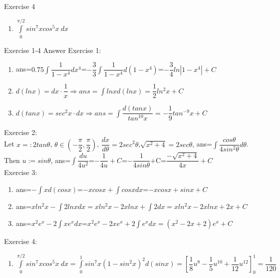 \documentclass{beamer}
\begin{document}
\begin{frame}{Exercise 4}
    \begin{enumerate}
        \item $\int\limits_0^{\pi/2} sin^7xcos^5x\ dx$
    \end{enumerate}
\end{frame}

\begin{frame}{Exercise 1-4 Answer}
\scriptsize
    Exercise 1:
    \begin{enumerate}
        \item ans=$0.75\int\dfrac{1}{1-x^4}dx^4$=$-\dfrac{3}{3}\int\dfrac{1}{1-x^4}d(1-x^4)$=$-\dfrac{3}{4}ln|1-x^4|+C$
        \item $d(ln x)=dx\cdot \dfrac{1}{x} \Rightarrow ans= \int lnx d(lnx)=\dfrac{1}{2}ln^2x+C$
        \item $d(tanx)=sec^2x\cdot dx\Rightarrow ans=\int \dfrac{d (tanx)}{tan^{10} x}=-\dfrac{1}{9}tan^{-9}x+C$
    \end{enumerate}
    Exercise 2:\\
    Let $x=:2tan\theta$, $\theta\in(-\dfrac{\pi}{2},\dfrac{\pi}{2})$, $\dfrac{dx}{d\theta}=2sec^2\theta$,$\sqrt{x^2+4}=2sec\theta$, ans=$\int \dfrac{cos\theta}{4sin^2\theta}d\theta$.\\
    Then $u:=sin\theta$, ans=$\int\dfrac{du}{4u^2}$=$-\dfrac{1}{4u}+C$=$-\dfrac{1}{4sin\theta}$+C=$\dfrac{-\sqrt{x^2+4}}{4x}+C$\\
    Exercise 3:
    \begin{enumerate}
        \item ans=$-\int xd(cosx)$=$-xcosx+\int cosx dx$=$-xcosx+sinx+C$
        \item ans=$xln^2x-\int 2lnxdx=xln^2x-2xlnx+\int 2dx=xln^2x-2xlnx+2x+C$
        \item ans=$x^2e^x-2\int xe^xdx$=$x^2e^x-2xe^x+2\int e^xdx=(x^2-2x+2)e^x+C$
    \end{enumerate}
    Exercise 4:
    \begin{enumerate}
        \item $\int\limits_0^{\pi/2} sin^7xcos^5x\ dx=\int\limits_0^{1} sin^7x(1-sin^2x)^2 d(sinx)=[\dfrac{1}{8}u^8-\dfrac{1}{5}u^{10}+\dfrac{1}{12}u^{12}]_{0}^{1}=\dfrac{1}{120}$
    \end{enumerate}
    
\normalsize
\end{frame}
\end{document}
